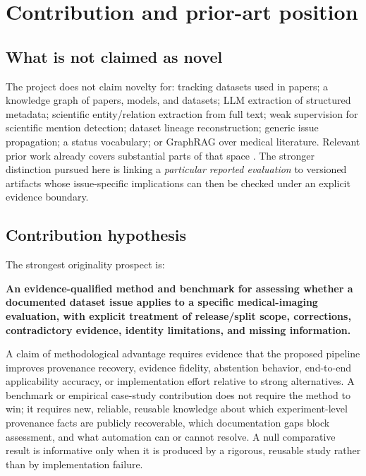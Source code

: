 \documentclass[11pt,a4paper]{article}
\begin{document}
\section{Contribution and prior-art position}
\label{sec:prior}
\subsection{What is not claimed as novel}
The project does not claim novelty for: tracking datasets used in papers; a knowledge graph of papers, models, and datasets; LLM extraction of structured metadata; scientific entity/relation extraction from full text; weak supervision for scientific mention detection; dataset lineage reconstruction; generic issue propagation; a status vocabulary; or GraphRAG over medical literature. Relevant prior work already covers substantial parts of that space \cite{inthepicture2025,sourget2024,atlas,tracing2026,copycats,openvex,scirex2020,scier2024,scidmt2024}. The stronger distinction pursued here is linking a \emph{particular reported evaluation} to versioned artifacts whose issue-specific implications can then be checked under an explicit evidence boundary.

\subsection{Contribution hypothesis}
The strongest originality prospect is:

\begin{decisionbox}
\textbf{An evidence-qualified method and benchmark for assessing whether a documented dataset issue applies to a specific medical-imaging evaluation, with explicit treatment of release/split scope, corrections, contradictory evidence, identity limitations, and missing information.}
\end{decisionbox}

A claim of methodological advantage requires evidence that the proposed pipeline improves provenance recovery, evidence fidelity, abstention behavior, end-to-end applicability accuracy, or implementation effort relative to strong alternatives. A benchmark or empirical case-study contribution does not require the method to win; it requires new, reliable, reusable knowledge about which experiment-level provenance facts are publicly recoverable, which documentation gaps block assessment, and what automation can or cannot resolve. A null comparative result is informative only when it is produced by a rigorous, reusable study rather than by implementation failure.
\end{document}

